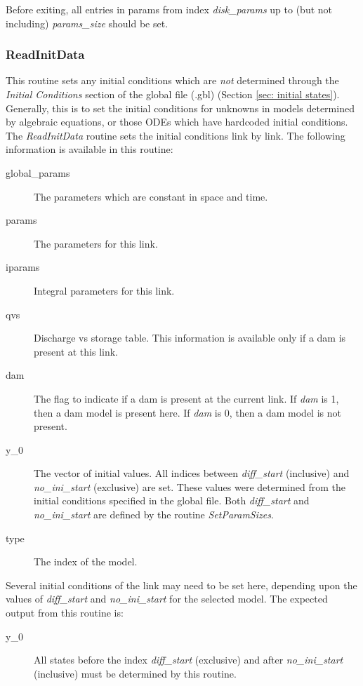 \documentclass[12pt]{article}
\begin{document}
Before exiting, all entries in params from index \emph{disk\_params} up to (but not including) \emph{params\_size} should be set.


\subsubsection{ReadInitData} \label{sec: readinitdata}

This routine sets any initial conditions which are \emph{not} determined through the \emph{Initial Conditions} section of the global file (.gbl) (Section \ref{sec: initial states}). Generally, this is to set the initial conditions for unknowns in models determined by algebraic equations, or those ODEs which have hardcoded initial conditions. The \emph{ReadInitData} routine sets the initial conditions link by link. The following information is available in this routine:

\begin{description}
 \item[global\_params] The parameters which are constant in space and time.
 \item[params] The parameters for this link.
 \item[iparams] Integral parameters for this link.
 \item[qvs] Discharge vs storage table. This information is available only if a dam is present at this link.
 \item[dam] The flag to indicate if a dam is present at the current link. If \emph{dam} is 1, then a dam model is present here. If \emph{dam} is 0, then a dam model is not present.
 \item[y\_0] The vector of initial values. All indices between \emph{diff\_start} (inclusive) and \emph{no\_ini\_start} (exclusive) are set. These values were determined from the initial conditions specified in the global file. Both \emph{diff\_start} and \emph{no\_ini\_start} are defined by the routine \emph{SetParamSizes}.
 \item[type] The index of the model.
\end{description}

Several initial conditions of the link may need to be set here, depending upon the values of \emph{diff\_start} and \emph{no\_ini\_start} for the selected model. The expected output from this routine is:

\begin{description}
 \item[y\_0] All states before the index \emph{diff\_start} (exclusive) and after \emph{no\_ini\_start} (inclusive) must be determined by this routine.
\end{description}
\end{document}
